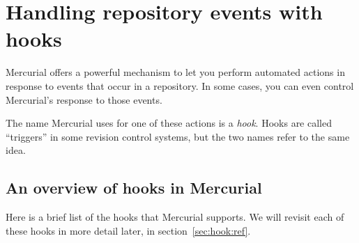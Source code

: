 \chapter{Handling repository events with hooks}
\label{chap:hook}

Mercurial offers a powerful mechanism to let you perform automated
actions in response to events that occur in a repository.  In some
cases, you can even control Mercurial's response to those events.

The name Mercurial uses for one of these actions is a \emph{hook}.
Hooks are called ``triggers'' in some revision control systems, but
the two names refer to the same idea.

\section{An overview of hooks in Mercurial}

Here is a brief list of the hooks that Mercurial supports.  We will
revisit each of these hooks in more detail later, in
section~\ref{sec:hook:ref}.

